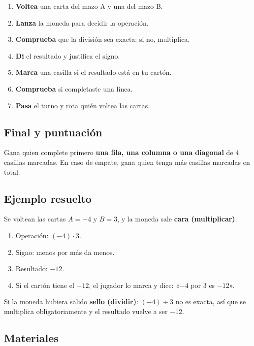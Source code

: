 \documentclass[12pt, letterpaper]{article}
\begin{document}
\begin{enumerate}[leftmargin=*]
  \item \textbf{Voltea} una carta del mazo A y una del mazo B.
  \item \textbf{Lanza} la moneda para decidir la operación.
  \item \textbf{Comprueba} que la división sea exacta; si no, multiplica.
  \item \textbf{Di} el resultado y justifica el signo.
  \item \textbf{Marca} una casilla si el resultado está en tu cartón.
  \item \textbf{Comprueba} si completaste una línea.
  \item \textbf{Pasa} el turno y rota quién voltea las cartas.
\end{enumerate}

\subsection{Final y puntuación}

Gana quien complete primero \textbf{una fila, una columna o una diagonal} de 4 casillas marcadas. En caso de empate, gana quien tenga más casillas marcadas en total.

\subsection{Ejemplo resuelto}

Se voltean las cartas $A=-4$ y $B=3$, y la moneda sale \textbf{cara (multiplicar)}.

\begin{cuadrosolucion}
\begin{enumerate}[leftmargin=*]
  \item Operación: $(-4)\cdot 3$.
  \item Signo: menos por más da menos.
  \item Resultado: $-12$.
  \item Si el cartón tiene el $-12$, el jugador lo marca y dice: «$-4$ por $3$ es $-12$».
\end{enumerate}
Si la moneda hubiera salido \textbf{sello (dividir)}: $(-4)\div 3$ no es exacta, así que se multiplica obligatoriamente y el resultado vuelve a ser $-12$.
\end{cuadrosolucion}

\subsection{Materiales}
\end{document}
